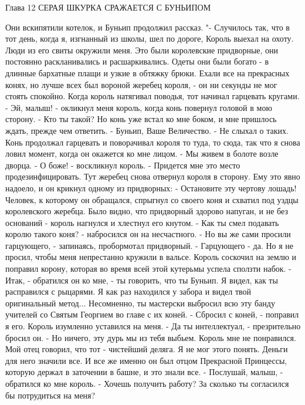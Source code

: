         Глава 12
        СЕРАЯ ШКУРКА СРАЖАЕТСЯ С БУНЬИПОМ

    Они вскипятили котелок, и Буньип продолжил рассказ.
    "- Случилось так, что в тот день, когда я, изгнанный из школы, шел 
по дороге, Король выехал на охоту. Люди из его свиты окружили меня. 
Это были королевские придворные, они постоянно раскланивались и 
расшаркивались. Одеты они были богато - в длинные бархатные плащи и 
узкие в обтяжку брюки. Ехали все на прекрасных конях, но лучше всех 
был вороной жеребец короля, - он ни секунды не мог стоять спокойно. 
Когда король натягивал поводья, тот начинал гарцевать кругами.
    - Эй, малыш! - окликнул меня король, когда конь повернул головой в 
мою сторону. - Кто ты такой?
    Но конь уже встал ко мне боком, и мне пришлось ждать, прежде чем 
ответить.
    - Буньип, Ваше Величество.
    - Не слыхал о таких.
    Конь продолжал гарцевать и поворачивал короля то туда, то сюда, 
так что я снова ловил момент, когда он окажется ко мне лицом.
    - Мы живем в болоте возле дворца.
    - О боже! - воскликнул король. - Придется мне это место 
продезинфицировать.
    Тут жеребец снова отвернул короля в сторону. Ему это явно надоело, 
и он крикнул одному из придворных:
    - Остановите эту чертову лошадь!
    Человек, к которому он обращался, спрыгнул со своего коня и 
схватил под уздцы королевского жеребца. Было видно, что придворный 
здорово напуган, и не без оснований - король нагнулся и хлестнул его 
кнутом.
    - Как ты смел подавать королю такого коня? - набросился он на 
несчастного.
    - Но вы же сами просили гарцующего, - запинаясь, пробормотал 
придворный.
    - Гарцующего - да. Но я не просил, чтобы меня непрестанно кружили 
в вальсе.
    Король соскочил на землю и поправил корону, которая во время всей 
этой кутерьмы успела сползти набок.
    - Итак, - обратился он ко мне, - ты говорить, что ты Буньип. Я 
видел, как ты расправился с рыцарями. Я как раз находился у забора и 
видел твой оригинальный метод... Несомненно, ты мастерски выбросил всю 
эту банду учителей со Святым Георгием во главе с их коней.
    - Сбросил с коней, - поправил я его. Король изумленно уставился на 
меня.
    - Да ты интеллектуал, - презрительно бросил он. - Но ничего, эту 
дурь мы из тебя выбьем.
    Король мне не понравился. Мой отец говорил, что тот - чистейший 
деляга. Я не мог этого понять. Деньги для него значили все. И все же 
именно он был отцом Прекрасной Принцессы, которую держал в заточении в 
башне, и это знали все.
    - Послушай, малыш, - обратился ко мне король. - Хочешь получить 
работу? За сколько ты согласился бы потрудиться на меня?
